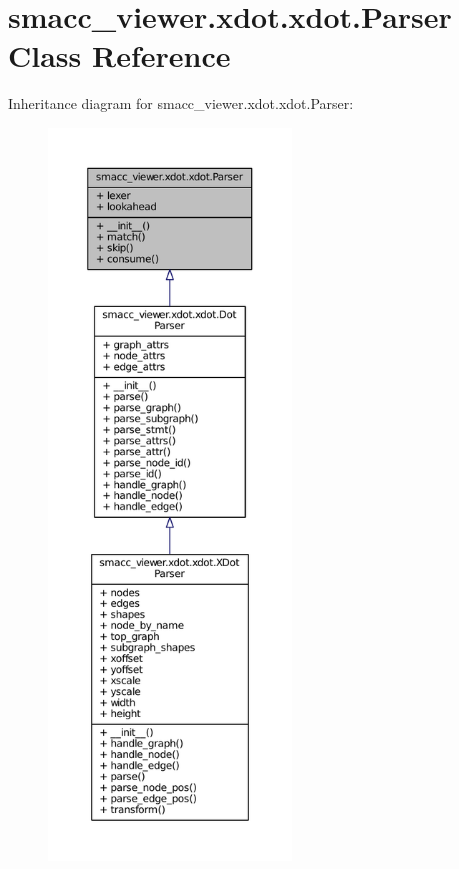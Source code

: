 \hypertarget{classsmacc__viewer_1_1xdot_1_1xdot_1_1Parser}{}\section{smacc\+\_\+viewer.\+xdot.\+xdot.\+Parser Class Reference}
\label{classsmacc__viewer_1_1xdot_1_1xdot_1_1Parser}


Inheritance diagram for smacc\+\_\+viewer.\+xdot.\+xdot.\+Parser\+:
\nopagebreak
\begin{figure}[H]
\begin{center}
\leavevmode
\includegraphics[height=550pt]{classsmacc__viewer_1_1xdot_1_1xdot_1_1Parser__inherit__graph}
\end{center}
\end{figure}


